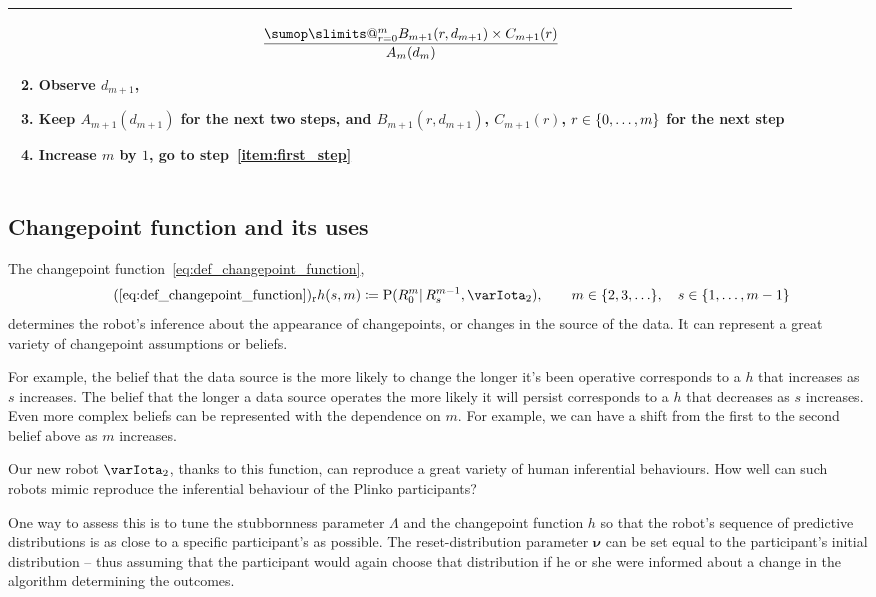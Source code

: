 \documentclass[\ifafour a4paper,12pt,\else a5paper,10pt,\fi%
onecolumn,oneside,article,%
british%
]{memoir}
\makeatletter
\theoremstyle{remark}
\theoremstyle{innote}
\def\sum{\DOTSI\sumop\slimits@}
\newcommand*{\defd}{\coloneqq}
\DeclarePairedDelimiter\set{\{}{\}}
\newcommand*{\p}{\mathrm{P}}%
\renewcommand*{\|}{\mathpunct{|}}
\newcommand*{\labelbis}[1]{\tag*{(\ref{#1})$_\text{r}$}}
\newcommand*{\yI}{\varIota}
\newcommand*{\yMc}{\yI_2}
\newcommand*{\yN}{\varLambda}
\newcommand*{\yn}{\bm{\nu}}
\newcommand*{\yrs}{h}
\makeatother
\begin{document}
\begin{table}[!p]
\begin{tabularx}{\textwidth}{X}
\begin{enumerate}
\[\begin{multlined}[][0.85\textwidth]
    \frac{\sum_{r=0}^{m} B_{m+1}(r,d_{m+1}) \times
      C_{m+1}(r)}{A_{m}(d_{m})}
  \end{multlined}
\]
\item Observe $d_{m+1}$, 
\item Keep $A_{m+1}(d_{m+1})$ for the next two steps, and
  $B_{m+1}(r,d_{m+1})$, $C_{m+1}(r)$, $r\in\set{0,\dotsc,m}$ for the next step
\item Increase $m$ by $1$, go to step~\ref{item:first_step}
  \end{enumerate}
  \\\hline
\end{tabularx}
\end{table}

\subsection{Changepoint function and its uses}
\label{sec:changepoint_choice}

The changepoint function~\eqref{eq:def_changepoint_function},
\begin{equation}\labelbis{eq:def_changepoint_function}
  \yrs(s,m)  \defd \p(R^{m}_{0} \|  R^{m-1}_{s}, \yMc),
  \qquad m \in\set{2,3,\dotsc}, \quad s\in\set{1,\dotsc,m-1}
\end{equation}
determines the robot's inference about the appearance of changepoints, or
changes in the source of the data. It can represent a great
variety of changepoint assumptions or beliefs.

For example, the belief that the data source is the more likely to change
the longer it's been operative corresponds to a $\yrs$ that increases as
$s$ increases. The belief that the longer a data source operates the more
likely it will persist corresponds to a $\yrs$ that decreases as $s$
increases. Even more complex beliefs can be represented with the dependence
on $m$. For example, we can have a shift from the first to the second
belief above as $m$ increases.

Our new robot $\yMc$, thanks to this function, can reproduce a great
variety of human inferential behaviours. How well can such robots mimic
reproduce the inferential behaviour of the Plinko participants?

One way to assess this is to tune the stubbornness parameter $\yN$ and the
changepoint function $\yrs$ so that the robot's sequence of predictive
distributions is as close to a specific participant's as possible. The
reset-distribution parameter $\yn$ can be set equal to the participant's
initial distribution -- thus assuming that the participant would again
choose that distribution if he or she were informed about a change in the
algorithm determining the outcomes.
\end{document}
